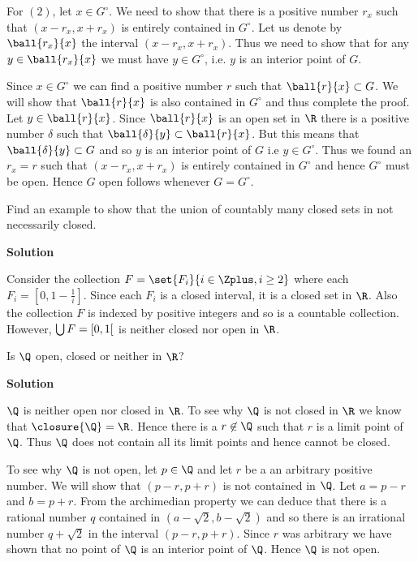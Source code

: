 \documentclass[11pt]{amstext-l}
\newcommand{\solution}{\textbf{\large Solution}}
\begin{document}
For $(2)$, let $x \in G^{\circ}$. We need to show that there is a positive number $r_x$
such that $(x - r_x , x + r_x)$ is entirely contained in $G^{\circ}$. Let us denote by
$\ball{r_x}{x}$ the interval $(x - r_x , x + r_x)$. Thus we need to show that for any $y \in
\ball{r_x}{x}$ we must have $y \in G^{\circ}$, i.e. $y$ is an interior point of $G$.

Since $x \in G^{\circ}$ we can find a positive number $r$ such that $\ball{r}{x} \subset G$. We
will show that $\ball{r}{x}$ is also contained in $G^{\circ}$ and thus complete the proof. Let $y
\in \ball{r}{x}$. Since $\ball{r}{x}$ is an open set in $\R$ there is a positive number $\delta$
such that $\ball{\delta}{y} \subset \ball{r}{x}$. But this means that $\ball{\delta}{y} \subset G$
and so $y$ is an interior point of $G$ i.e $y \in G^{\circ}$. Thus we found an $r_x = r$ such that 
$(x - r_x, x+r_x)$ is entirely contained in $G^{\circ}$ and hence $G^{\circ}$ must be open. Hence
$G$ open follows whenever $G = G^{\circ}$.

\pagebreak

\begin{homeworkProblem}[3]
    Find an example to show that the union of countably many closed sets in not necessarily closed.

    \solution{}

    Consider the collection  $F = \set{F_i}{i \in \Zplus,i \geq 2}$ where each $F_i =
    \left[0,1-\frac{1}{i}\right]$. Since each $F_i$ is a closed interval, it is a closed set in
    $\R$. Also the collection $F$ is indexed by positive integers and so is a countable collection.
    However, $\bigcup {F} = \interval[open right]{0}{1}$ is neither closed nor open in $\R$. 
\end{homeworkProblem}
\pagebreak
\begin{homeworkProblem}[4]
    Is $\Q$ open, closed or neither in $\R$?

    \solution{}

    $\Q$ is neither open nor closed in $\R$. To see why $\Q$ is not closed in $\R$ we know that
    $\closure{\Q}= \R$. Hence there is a $r \not \in \Q$ such that $r$ is a limit point of $\Q$.
    Thus $\Q$ does not contain all its limit points and hence cannot be closed. 

    To see why $\Q$ is not open, let $p \in \Q$ and let $r$ be a an arbitrary positive number. We
    will show that $(p-r,p+r)$ is not contained in $\Q$. Let $a = p-r$ and $b = p+r$. From the
    archimedian property we can deduce that there is a rational number $q$ contained in
    $(a-\sqrt{2},b-\sqrt{2})$ and so there is an irrational number $q+\sqrt{2}$ in the interval
    $(p-r,p+r)$. Since $r$ was arbitrary we have shown that no point of $\Q$ is an interior point of
    $\Q$. Hence $\Q$ is not open.


\end{homeworkProblem}
\end{document}
